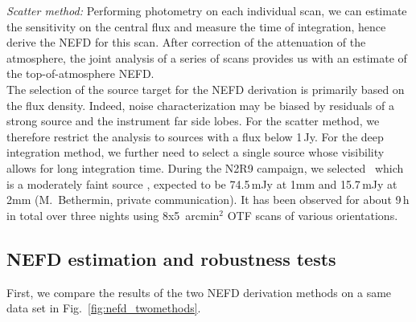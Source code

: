 \noindent \emph{Scatter method:} Performing photometry on each
individual scan, we can estimate the sensitivity on the central flux
and measure the time of integration, hence derive the NEFD for this
scan. After correction of the attenuation of the atmosphere, the joint
analysis of a series of scans provides us with an estimate of the
top-of-atmosphere NEFD. \\

The selection of the source target for the NEFD derivation is
primarily based on the flux density. Indeed, noise
characterization may be biased by residuals of a strong source and the
instrument far side lobes. For the scatter method, we therefore
restrict the analysis to sources with a flux below 1\,Jy. For the deep
integration method, we further need to select a single source whose
visibility allows for long integration time. During the N2R9 campaign,
we selected \hls\, which is a
moderately faint source \citep{hls_combes}, expected to be
74.5\,mJy at 1mm and 15.7\,mJy at 2mm (M.~Bethermin, private
communication). It has been observed for about 9\,h in total over
three nights using 8x5~arcmin$^2$ OTF scans of various orientations. 


\subsection{NEFD estimation and robustness tests}
\label{se:nefd_results}

First, we compare the results of the two NEFD derivation methods on a
same data set in Fig.~\ref{fig:nefd_twomethods}.


